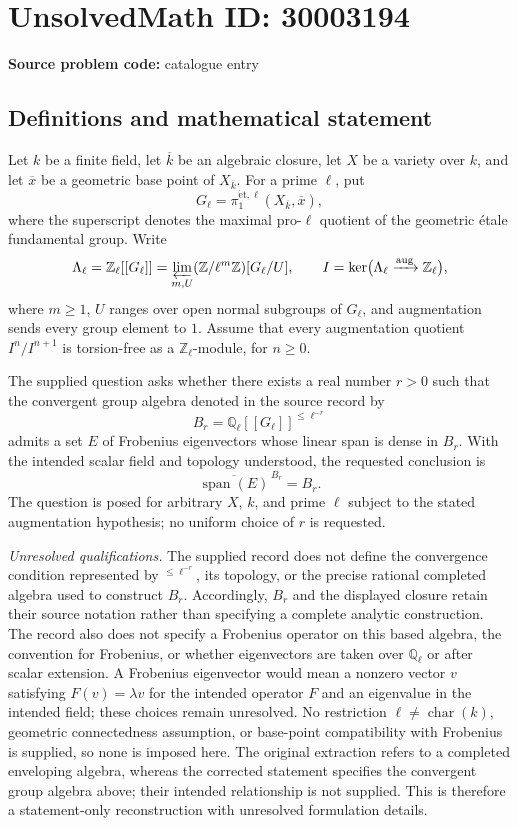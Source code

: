 \documentclass[11pt]{article}
\begin{document}
\section*{UnsolvedMath ID: 30003194}
\textbf{Source problem code:} catalogue entry
\subsection{Definitions and mathematical statement}
Let \(k\) be a finite field, let \(\overline{k}\) be an algebraic closure, let \(X\) be a variety over \(k\), and let \(\overline{x}\) be a geometric base point of \(X_{\overline{k}}\). For a prime \(\ell\), put
\[
G_\ell=\pi_1^{\mathrm{\acute et},\ell}(X_{\overline{k}},\overline{x}),
\]
where the superscript denotes the maximal pro-\(\ell\) quotient of the geometric étale fundamental group. Write
\[
\Lambda_\ell=\mathbb Z_\ell[[G_\ell]]
=\varprojlim_{m,U}(\mathbb Z/\ell^m\mathbb Z)[G_\ell/U],
\qquad
I=\ker\bigl(\Lambda_\ell\xrightarrow{\mathrm{aug}}\mathbb Z_\ell\bigr),
\]
where \(m\geq 1\), \(U\) ranges over open normal subgroups of \(G_\ell\), and augmentation sends every group element to \(1\). Assume that every augmentation quotient \(I^n/I^{n+1}\) is torsion-free as a \(\mathbb Z_\ell\)-module, for \(n\geq 0\).

The supplied question asks whether there exists a real number \(r>0\) such that the convergent group algebra denoted in the source record by
\[
B_r=\mathbb Q_\ell[[G_\ell]]^{\leq\ell^{-r}}
\]
admits a set \(E\) of Frobenius eigenvectors whose linear span is dense in \(B_r\). With the intended scalar field and topology understood, the requested conclusion is
\[
\overline{\operatorname{span}(E)}^{\,B_r}=B_r.
\]
The question is posed for arbitrary \(X\), \(k\), and prime \(\ell\) subject to the stated augmentation hypothesis; no uniform choice of \(r\) is requested.

\textit{Unresolved qualifications.} The supplied record does not define the convergence condition represented by \({}^{\leq\ell^{-r}}\), its topology, or the precise rational completed algebra used to construct \(B_r\). Accordingly, \(B_r\) and the displayed closure retain their source notation rather than specifying a complete analytic construction. The record also does not specify a Frobenius operator on this based algebra, the convention for Frobenius, or whether eigenvectors are taken over \(\mathbb Q_\ell\) or after scalar extension. A Frobenius eigenvector would mean a nonzero vector \(v\) satisfying \(F(v)=\lambda v\) for the intended operator \(F\) and an eigenvalue in the intended field; these choices remain unresolved. No restriction \(\ell\neq\operatorname{char}(k)\), geometric connectedness assumption, or base-point compatibility with Frobenius is supplied, so none is imposed here. The original extraction refers to a completed enveloping algebra, whereas the corrected statement specifies the convergent group algebra above; their intended relationship is not supplied. This is therefore a statement-only reconstruction with unresolved formulation details.
\end{document}
